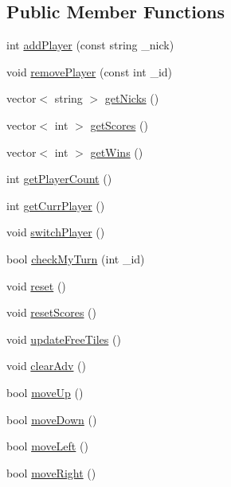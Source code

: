 \subsection*{Public Member Functions}
\begin{DoxyCompactItemize}
\item 
int \hyperlink{classServerModel_a8002df80f7319f9cc726ecf6f1cb295e}{add\-Player} (const string \-\_\-nick)
\item 
void \hyperlink{classServerModel_a03636f686c14d807e5f8e7527b4f3eca}{remove\-Player} (const int \-\_\-id)
\item 
vector$<$ string $>$ \hyperlink{classServerModel_abd04bc42130f10b6fcf9f6ff96441fe7}{get\-Nicks} ()
\item 
vector$<$ int $>$ \hyperlink{classServerModel_a42da33b42e600dfe892509a3e1f04fb0}{get\-Scores} ()
\item 
vector$<$ int $>$ \hyperlink{classServerModel_a0514ab9d46c5935d47332616313128f2}{get\-Wins} ()
\item 
int \hyperlink{classServerModel_a53887668e0e8193fb345710d76dd12b7}{get\-Player\-Count} ()
\item 
int \hyperlink{classServerModel_a02e91f06a02510759b370eefbcb52061}{get\-Curr\-Player} ()
\item 
void \hyperlink{classServerModel_af98c5669849c1d648b6103fda3f4a10c}{switch\-Player} ()
\item 
bool \hyperlink{classServerModel_ab4cf786672a46e6285eb72907005ae64}{check\-My\-Turn} (int \-\_\-id)
\item 
void \hyperlink{classServerModel_a5ccabb0400aff1109578dacfc1162af4}{reset} ()
\item 
void \hyperlink{classServerModel_a7b17b497feec14ba4ea7746f17b479e9}{reset\-Scores} ()
\item 
void \hyperlink{classServerModel_a277375b608707d6f6c308f4a8af2e1b7}{update\-Free\-Tiles} ()
\item 
void \hyperlink{classServerModel_ad3b7678f205acbf9a6efe65ba60cfd73}{clear\-Adv} ()
\item 
bool \hyperlink{classServerModel_a71bd99e883342592c9f9842c63503044}{move\-Up} ()
\item 
bool \hyperlink{classServerModel_ac12b01ceb25260cee42e4b2f6c5afa00}{move\-Down} ()
\item 
bool \hyperlink{classServerModel_a3d33c6ca6db221fb38b12ddcd1b973d7}{move\-Left} ()
\item 
bool \hyperlink{classServerModel_a12a3fcd85eda6068b85401f398ba567f}{move\-Right} ()

\end{DoxyCompactItemize}
